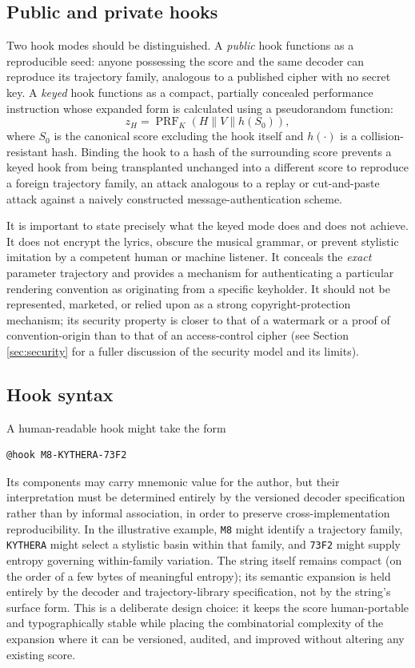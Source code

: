 \documentclass[11pt]{article}
\DeclareMathOperator{\PRF}{PRF}
\begin{document}
\subsection{Public and private hooks}

Two hook modes should be distinguished. A \emph{public} hook functions as a reproducible seed: anyone possessing the score and the same decoder can reproduce its trajectory family, analogous to a published cipher with no secret key. A \emph{keyed} hook functions as a compact, partially concealed performance instruction whose expanded form is calculated using a pseudorandom function:
\[
z_H=\PRF_K(H\parallel V\parallel h(S_0)),
\]
where $S_0$ is the canonical score excluding the hook itself and $h(\cdot)$ is a collision-resistant hash. Binding the hook to a hash of the surrounding score prevents a keyed hook from being transplanted unchanged into a different score to reproduce a foreign trajectory family, an attack analogous to a replay or cut-and-paste attack against a naively constructed message-authentication scheme.

It is important to state precisely what the keyed mode does and does not achieve. It does not encrypt the lyrics, obscure the musical grammar, or prevent stylistic imitation by a competent human or machine listener. It conceals the \emph{exact} parameter trajectory and provides a mechanism for authenticating a particular rendering convention as originating from a specific keyholder. It should not be represented, marketed, or relied upon as a strong copyright-protection mechanism; its security property is closer to that of a watermark or a proof of convention-origin than to that of an access-control cipher (see Section \ref{sec:security} for a fuller discussion of the security model and its limits).

\subsection{Hook syntax}

A human-readable hook might take the form
\begin{Verbatim}[frame=single,fontsize=\small]
@hook M8-KYTHERA-73F2
\end{Verbatim}
Its components may carry mnemonic value for the author, but their interpretation must be determined entirely by the versioned decoder specification rather than by informal association, in order to preserve cross-implementation reproducibility. In the illustrative example, \texttt{M8} might identify a trajectory family, \texttt{KYTHERA} might select a stylistic basin within that family, and \texttt{73F2} might supply entropy governing within-family variation. The string itself remains compact (on the order of a few bytes of meaningful entropy); its semantic expansion is held entirely by the decoder and trajectory-library specification, not by the string's surface form. This is a deliberate design choice: it keeps the score human-portable and typographically stable while placing the combinatorial complexity of the expansion where it can be versioned, audited, and improved without altering any existing score.
\end{document}
